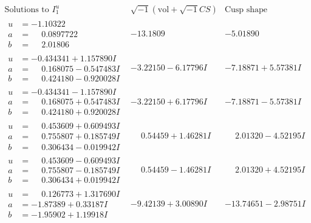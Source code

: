 \documentclass[1p]{elsarticle_modified}
\theoremstyle{definition}
\newcommand{\I}{\sqrt{-1}}
\begin{document}
$$\begin{array}{c|c|c}  
\text{Solutions to }I^u_{1}& \I (\text{vol} + \sqrt{-1}CS) & \text{Cusp shape}\\
 \hline 
\begin{aligned}
u &= -1.10322\phantom{ +0.000000I} \\
a &= \phantom{-}0.0897722\phantom{ +0.000000I} \\
b &= \phantom{-}2.01806\phantom{ +0.000000I}\end{aligned}
 & -13.1809\phantom{ +0.000000I} & -5.01890\phantom{ +0.000000I} \\ \hline\begin{aligned}
u &= -0.434341 + 1.157890 I \\
a &= \phantom{-}0.168075 - 0.547483 I \\
b &= \phantom{-}0.424180 - 0.920028 I\end{aligned}
 & -3.22150 - 6.17796 I & -7.18871 + 5.57381 I \\ \hline\begin{aligned}
u &= -0.434341 - 1.157890 I \\
a &= \phantom{-}0.168075 + 0.547483 I \\
b &= \phantom{-}0.424180 + 0.920028 I\end{aligned}
 & -3.22150 + 6.17796 I & -7.18871 - 5.57381 I \\ \hline\begin{aligned}
u &= \phantom{-}0.453609 + 0.609493 I \\
a &= \phantom{-}0.755807 + 0.185749 I \\
b &= \phantom{-}0.306434 - 0.019942 I\end{aligned}
 & \phantom{-}0.54459 + 1.46281 I & \phantom{-}2.01320 - 4.52195 I \\ \hline\begin{aligned}
u &= \phantom{-}0.453609 - 0.609493 I \\
a &= \phantom{-}0.755807 - 0.185749 I \\
b &= \phantom{-}0.306434 + 0.019942 I\end{aligned}
 & \phantom{-}0.54459 - 1.46281 I & \phantom{-}2.01320 + 4.52195 I \\ \hline\begin{aligned}
u &= \phantom{-}0.126773 + 1.317690 I \\
a &= -1.87389 + 0.33187 I \\
b &= -1.95902 + 1.19918 I\end{aligned}
 & -9.42139 + 3.00890 I & -13.74651 - 2.98751 I \\ \hline\begin{aligned}

\end{aligned}
\end{array}$$
\end{document}
